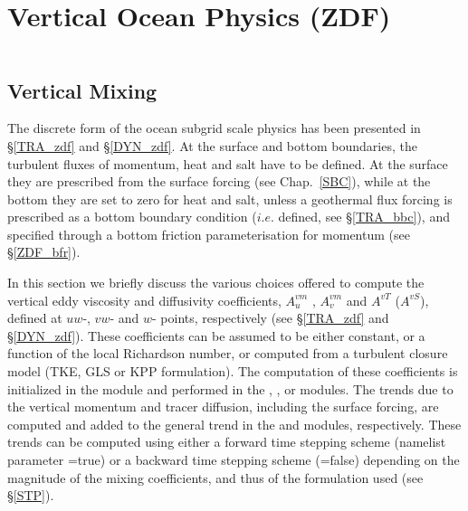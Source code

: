 \documentclass[NEMO_book]{subfiles}
\begin{document}
\chapter{Vertical Ocean Physics (ZDF)}
\label{ZDF}
\minitoc



\newpage
$\ $\newline    %


\section{Vertical Mixing}
\label{ZDF_zdf}

The discrete form of the ocean subgrid scale physics has been presented in 
\S\ref{TRA_zdf} and \S\ref{DYN_zdf}. At the surface and bottom boundaries, 
the turbulent fluxes of momentum, heat and salt have to be defined. At the 
surface they are prescribed from the surface forcing (see Chap.~\ref{SBC}), 
while at the bottom they are set to zero for heat and salt, unless a geothermal 
flux forcing is prescribed as a bottom boundary condition ($i.e.$  
defined, see \S\ref{TRA_bbc}), and specified through a bottom friction 
parameterisation for momentum (see \S\ref{ZDF_bfr}).

In this section we briefly discuss the various choices offered to compute 
the vertical eddy viscosity and diffusivity coefficients, $A_u^{vm}$ , 
$A_v^{vm}$ and $A^{vT}$ ($A^{vS}$), defined at $uw$-, $vw$- and $w$- 
points, respectively (see \S\ref{TRA_zdf} and \S\ref{DYN_zdf}). These 
coefficients can be assumed to be either constant, or a function of the local 
Richardson number, or computed from a turbulent closure model (TKE, GLS or KPP formulation). 
The computation of these coefficients is initialized in the  module 
and performed in the , ,  or  modules. 
The trends due to the vertical momentum and tracer diffusion, including the surface forcing, 
are computed and added to the general trend in the  and  modules, respectively. 
These trends can be computed using either a forward time stepping scheme 
(namelist parameter =true) or a backward time stepping 
scheme (=false) depending on the magnitude of the mixing 
coefficients, and thus of the formulation used (see \S\ref{STP}).
\end{document}
